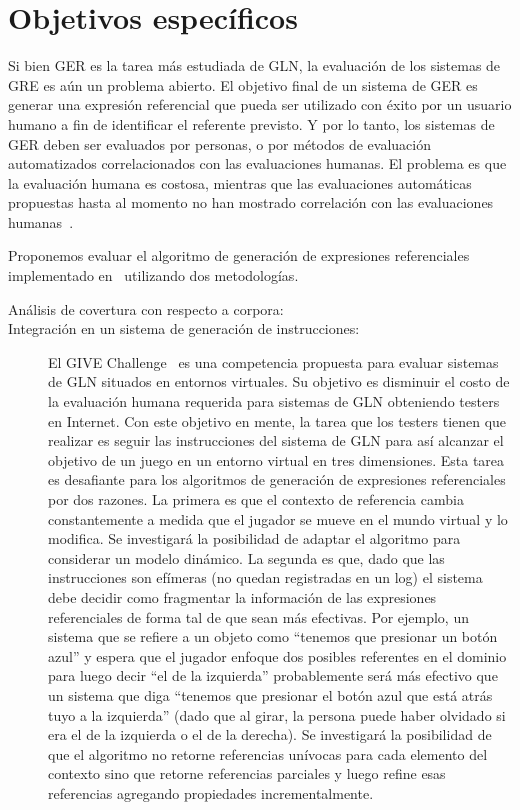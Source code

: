 \section{Objetivos espec\'ificos}
\label{objetivos}

Si bien GER es la tarea m\'as estudiada de GLN, la evaluaci\'on de los sistemas de GRE es a\'un un problema abierto. El objetivo final de un sistema de GER es generar una expresi\'on referencial que pueda ser utilizado con \'exito por un usuario humano a fin de identificar el referente previsto. Y por lo tanto, los sistemas de GER deben ser evaluados por personas, o por m\'etodos de evaluaci\'on automatizados correlacionados con las evaluaciones humanas. El problema es que la evaluaci\'on humana es costosa, mientras que las evaluaciones autom\'aticas propuestas hasta al momento no han mostrado correlaci\'on con las evaluaciones humanas~\cite{reiter09}.

Proponemos evaluar el algoritmo de generaci\'on de expresiones referenciales implementado en~\cite{Areces2008} utilizando dos metodolog\'ias. 

\begin{description}
\item[An\'alisis de covertura con respecto a corpora:] 
\item[Integraci\'on en un sistema de generaci\'on de instrucciones:] El GIVE Challenge~\cite{} es una competencia propuesta para evaluar sistemas de GLN situados en entornos virtuales. Su objetivo es disminuir el costo de la evaluaci\'on humana requerida para sistemas de GLN obteniendo testers en Internet. Con este objetivo en mente, la tarea que los testers tienen que realizar es seguir las instrucciones del sistema de GLN para as\'i alcanzar el objetivo de un juego en un entorno virtual en tres dimensiones. Esta tarea es desafiante para los algoritmos de generaci\'on de expresiones referenciales por dos razones. La primera es que el contexto de referencia cambia constantemente a medida que el jugador se mueve en el mundo virtual y lo modifica. Se investigar\'a la posibilidad de adaptar el algoritmo para considerar un modelo din\'amico. La segunda es que, dado que las instrucciones son ef\'imeras (no quedan registradas en un log) el sistema debe decidir como fragmentar la informaci\'on de las expresiones referenciales de forma tal de que sean m\'as efectivas. Por ejemplo, un sistema que se refiere a un objeto como ``tenemos que presionar un bot\'on azul'' y espera que el jugador enfoque dos posibles referentes en el dominio para luego decir ``el de la izquierda'' probablemente ser\'a m\'as efectivo que un sistema que diga ``tenemos que presionar el bot\'on azul que est\'a atr\'as tuyo a la izquierda'' (dado que al girar, la persona puede haber olvidado si era el de la izquierda o el de la derecha). Se investigar\'a la posibilidad de que el algoritmo no retorne referencias un\'ivocas para cada elemento del contexto sino que retorne referencias parciales y luego refine esas referencias agregando propiedades incrementalmente. 
\end{description}

